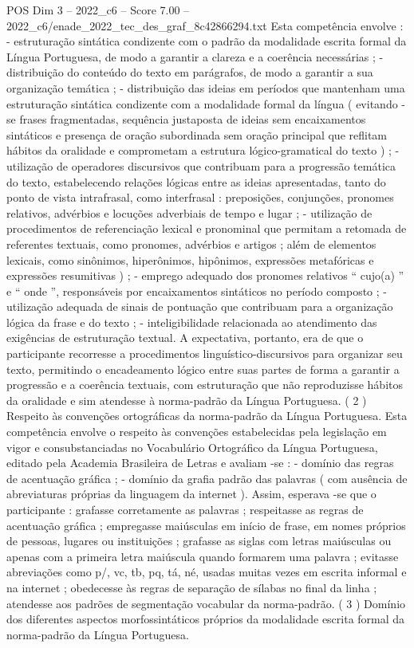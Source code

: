 \begin{textsample}{POS Dim 3 – 2022\_c6 – Score 7.00 – 2022\_c6/enade\_2022\_tec\_des\_graf\_8c42866294.txt}
Esta competência envolve : - estruturação sintática condizente com o padrão da modalidade escrita formal da Língua Portuguesa, de modo a garantir a clareza e a coerência necessárias ; - distribuição do conteúdo do texto em parágrafos, de modo a garantir a sua organização temática ; - distribuição das ideias em períodos que mantenham uma estruturação sintática condizente com a modalidade formal da língua ( evitando -se frases fragmentadas, sequência justaposta de ideias sem encaixamentos sintáticos e presença de oração subordinada sem oração principal que reflitam hábitos da oralidade e comprometam a estrutura lógico-gramatical do texto ) ; - utilização de operadores discursivos que contribuam para a progressão temática do texto, estabelecendo relações lógicas entre as ideias apresentadas, tanto do ponto de vista intrafrasal, como interfrasal : preposições, conjunções, pronomes relativos, advérbios e locuções adverbiais de tempo e lugar ; - utilização de procedimentos de referenciação lexical e pronominal que permitam a retomada de referentes textuais, como pronomes, advérbios e artigos ; além de elementos lexicais, como sinônimos, hiperônimos, hipônimos, expressões metafóricas e expressões resumitivas ) ; - emprego adequado dos pronomes relativos “ cujo(a) ” e “ onde ”, responsáveis por encaixamentos sintáticos no período composto ; - utilização adequada de sinais de pontuação que contribuam para a organização lógica da frase e do texto ; - inteligibilidade relacionada ao atendimento das exigências de estruturação textual.
A expectativa, portanto, era de que o participante recorresse a procedimentos linguístico-discursivos para organizar seu texto, permitindo o encadeamento lógico entre suas partes de forma a garantir a progressão e a coerência textuais, com estruturação que não reproduzisse hábitos da oralidade e sim atendesse à norma-padrão da Língua Portuguesa. ( 2 ) Respeito às convenções ortográficas da norma-padrão da Língua Portuguesa.
Esta competência envolve o respeito às convenções estabelecidas pela legislação em vigor e consubstanciadas no Vocabulário Ortográfico da Língua Portuguesa, editado pela Academia Brasileira de Letras e avaliam -se : - domínio das regras de acentuação gráfica ; - domínio da grafia padrão das palavras ( com ausência de abreviaturas próprias da linguagem da internet ).
Assim, esperava -se que o participante : grafasse corretamente as palavras ; respeitasse as regras de acentuação gráfica ; empregasse maiúsculas em início de frase, em nomes próprios de pessoas, lugares ou instituições ; grafasse as siglas com letras maiúsculas ou apenas com a primeira letra maiúscula quando formarem uma palavra ; evitasse abreviações como p/, vc, tb, pq, tá, né, usadas muitas vezes em escrita informal e na internet ; obedecesse às regras de separação de sílabas no final da linha ; atendesse aos padrões de segmentação vocabular da norma-padrão. ( 3 ) Domínio dos diferentes aspectos morfossintáticos próprios da modalidade escrita formal da norma-padrão da Língua Portuguesa.

\end{textsample}
